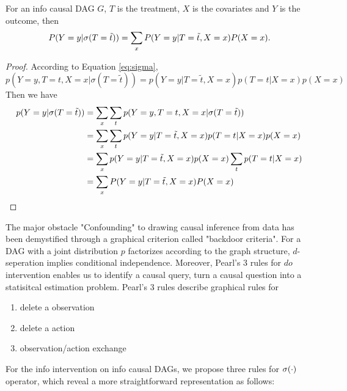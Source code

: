 \begin{Thm}
 	For an info causal DAG $G$, $T$ is the treatment, $X$ is the covariates and $Y$ is the outcome, then
 	$$
 	P(Y=y|\mathrm{\sigma}(T=\tilde{t})) = \sum_x P(Y=y|T=\tilde{t}, X=x) P(X=x).
	$$
 \end{Thm}
 

\begin{proof}
	According to Equation \ref{eq:sigma},
 	$$
 	p(Y=y, T=t, X=x|\sigma(T=\tilde{t})) = p(Y=y|T=\tilde{t}, X=x) p(T=t|X=x) p(X=x) 
 	$$
 	Then we have
 	\begin{align*}
 		p(Y=y|\mathrm{\sigma}(T=\tilde{t})) &= \sum_x \sum_t p(Y=y, T=t, X=x|\sigma(T=\tilde{t})) \\
 											&= \sum_x \sum_t p(Y=y|T=\tilde{t}, X=x) p(T=t|X=x) p(X=x) \\
 											&= \sum_x p(Y=y|T=\tilde{t}, X=x) p(X=x) \sum_t p(T=t|X=x) \\
 											&= \sum_x P(Y=y|T=\tilde{t}, X=x) P(X=x) \\
 	\end{align*}
\end{proof}

The major obstacle "Confounding" to drawing causal inference from data has been demystified through a graphical criterion called "backdoor criteria". For a DAG with a joint distribution  $p$  factorizes according to the graph structure, $d$-seperation implies conditional independence.  Moreover, Pearl's 3 rules for $do$ intervention enables us to identify a causal query, turn a causal question into a statisitcal estimation problem. Pearl's 3 rules describe graphical rules for
\begin{enumerate}[1)]
	\setlength{\itemsep}{0em}
	\item delete a observation
	\item delete a action 
	\item observation/action exchange
\end{enumerate}

For the info intervention on info causal DAGs, we propose three rules for $\mathrm{\sigma}(\cdot)$ operator, which reveal a more straightforward representation as follows: 

